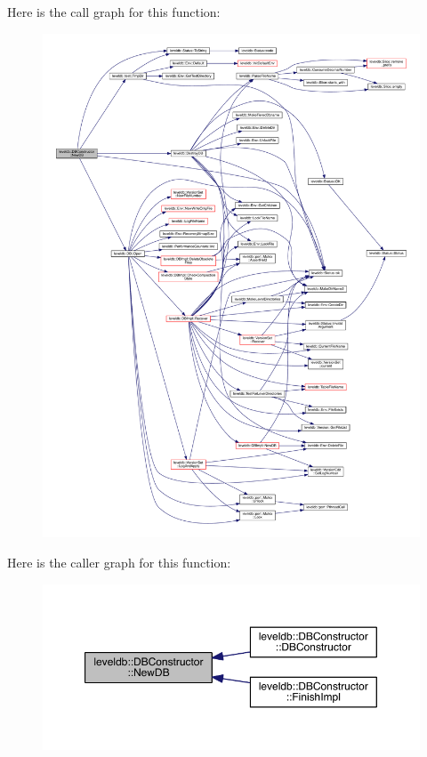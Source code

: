 Here is the call graph for this function\+:\nopagebreak
\begin{figure}[H]
\begin{center}
\leavevmode
\includegraphics[width=350pt]{classleveldb_1_1_d_b_constructor_ac48bfe871db8558b57427843465e6c65_cgraph}
\end{center}
\end{figure}




Here is the caller graph for this function\+:\nopagebreak
\begin{figure}[H]
\begin{center}
\leavevmode
\includegraphics[width=350pt]{classleveldb_1_1_d_b_constructor_ac48bfe871db8558b57427843465e6c65_icgraph}
\end{center}
\end{figure}


